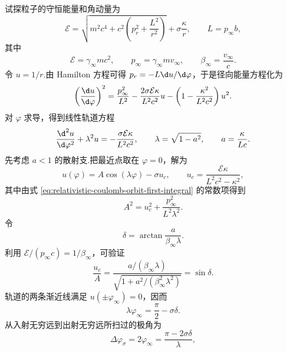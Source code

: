 试探粒子的守恒能量和角动量为
\begin{equation}
 \mathcal E
 =\sqrt{m^2c^4+c^2\left(p_r^2+\frac{L^2}{r^2}\right)}
 +\sigma\frac{\kappa}{r},
 \qquad
 L=p_\infty b,
 \label{eq:relativistic-coulomb-conserved-quantities}
\end{equation}
其中
\begin{equation}
 \mathcal E=\gamma_\infty mc^2,
 \qquad
 p_\infty=\gamma_\infty mv_\infty,
 \qquad
 \beta_\infty=\frac{v_\infty}{c}.
\end{equation}
令 $u=1/r$.由 Hamilton 方程可得 $p_r=-L\d u/\d\varphi$，于是径向能量方程化为
\begin{equation}
 \left(\frac{\d u}{\d\varphi}\right)^2
 =\frac{p_\infty^2}{L^2}
 -\frac{2\sigma\mathcal E\kappa}{L^2c^2}u
 -\left(1-\frac{\kappa^2}{L^2c^2}\right)u^2.
 \label{eq:relativistic-coulomb-orbit-first-integral}
\end{equation}
对 $\varphi$ 求导，得到线性轨道方程
\begin{equation}
 \frac{\d^2u}{\d\varphi^2}+\lambda^2u
 =-\frac{\sigma\mathcal E\kappa}{L^2c^2},
 \qquad
 \lambda=\sqrt{1-a^2},
 \qquad
 a=\frac{\kappa}{Lc}.
 \label{eq:relativistic-coulomb-orbit-equation}
\end{equation}
先考虑 $a<1$ 的散射支.把最近点取在 $\varphi=0$，解为
\begin{equation}
 u(\varphi)=A\cos(\lambda\varphi)-\sigma u_c,
 \qquad
 u_c=\frac{\mathcal E\kappa}{L^2c^2-\kappa^2},
 \label{eq:relativistic-coulomb-orbit-solution}
\end{equation}
其中由式 \eqref{eq:relativistic-coulomb-orbit-first-integral} 的常数项得到
\begin{equation}
 A^2=u_c^2+\frac{p_\infty^2}{L^2\lambda^2}.
 \label{eq:relativistic-coulomb-orbit-amplitude}
\end{equation}
令
\begin{equation}
 \delta
 =\arctan\frac{a}{\beta_\infty\lambda}.
 \label{eq:relativistic-coulomb-delta}
\end{equation}
利用 $\mathcal E/(p_\infty c)=1/\beta_\infty$，可验证
\begin{equation}
 \frac{u_c}{A}
 =\frac{a/(\beta_\infty\lambda)}
 {\sqrt{1+a^2/(\beta_\infty^2\lambda^2)}}
 =\sin\delta.
\end{equation}
轨道的两条渐近线满足 $u(\pm\varphi_\infty)=0$，因而
\begin{equation}
 \lambda\varphi_\infty=\frac{\pi}{2}-\sigma\delta.
\end{equation}
从入射无穷远到出射无穷远所扫过的极角为
\begin{equation}
 \Delta\varphi_\sigma
 =2\varphi_\infty
 =\frac{\pi-2\sigma\delta}{\lambda},
 \label{eq:darwin-coulomb-swept-angle}
\end{equation}
